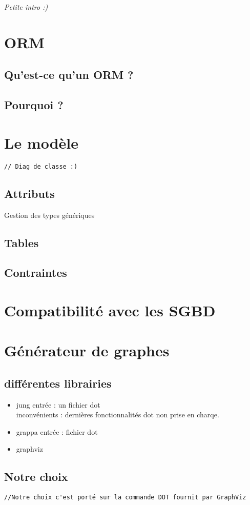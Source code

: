 \textit{Petite intro :)}

\section{ORM}
\subsection{Qu'est-ce qu'un ORM ?}
\subsection{Pourquoi ?}

\section{Le modèle}
	\verb+// Diag de classe :)+
	\subsection{Attributs}
		Gestion des types génériques
	\subsection{Tables}
	\subsection{Contraintes}

\section{Compatibilité avec les SGBD}

\section{Générateur de graphes}
  \subsection{différentes librairies}
		\begin{itemize}
			\item jung
				entrée : un fichier dot\\
				inconvénients : dernières fonctionnalités dot non prise en charqe.
			\item grappa
				 entrée : fichier dot
			\item graphviz
		\end{itemize}	
  \subsection{Notre choix}
		\verb+//Notre choix c'est porté sur la commande DOT fournit par GraphViz+


